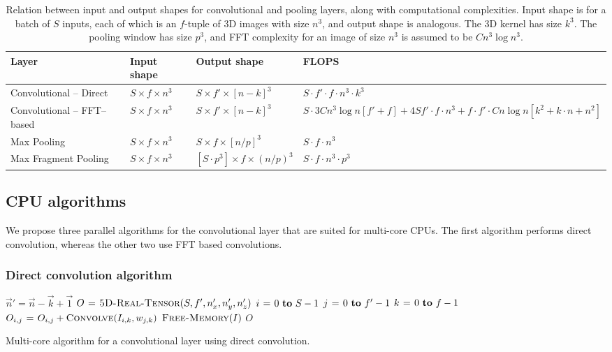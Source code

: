 \documentclass[conference]{./IEEEtran/IEEEtran}
\begin{document}
  \begin{table}[t]
    {\footnotesize
    \centering
    \begin{tabular}{l|lll}
      \toprule
      Layer   & Input shape    & Output shape     & FLOPS \\
      \midrule
      Convolutional -- Direct &
      $S \times f \times n^3$ &
      $S \times f' \times [n-k]^3$ &
      $S \cdot f' \cdot f \cdot n^3 \cdot k^3$ \\
      Convolutional -- FFT--based &
      $S \times f \times n^3$ &
      $S \times f' \times [n-k]^3$ &
      $S \cdot 3Cn^3 \log n[f' + f] + 4Sf' \cdot f \cdot n^3 + f \cdot f' \cdot Cn \log n[k^2 + k \cdot n + n^2]$ \\
      Max Pooling &
      $S \times f \times n^3$ &
      $S \times f \times [n/p]^3$ &
      $S \cdot f \cdot n^3$ \\
      Max Fragment Pooling &
      $S \times f \times n^3$ &
      $[S \cdot p^3] \times f \times (n/p)^3$ &
      $S \cdot f \cdot n^3 \cdot p^3$ \\
      \bottomrule
    \end{tabular}
    \caption{Relation between input and output shapes for convolutional and pooling layers, along with computational complexities. Input shape is for a batch of $S$ inputs, each of which is an $f$-tuple of 3D images with size $n^3$, and output shape is analogous. The 3D kernel has size $k^3$. The pooling window has size $p^3$, and FFT complexity for an image of size $n^3$ is assumed to be $C n^3\log n^3$.}
    \label{table:layers_complexity}
    }
  \end{table}


\subsection{CPU algorithms}

  We propose three parallel algorithms for the convolutional layer
  that are suited for multi-core CPUs.  The first algorithm performs
  direct convolution, whereas the other two use FFT based
  convolutions.

\subsubsection{Direct convolution algorithm}

  \begin{algorithm}
    {\footnotesize
      \begin{codebox}
        \li $\vec{n}' = \vec{n} - \vec{k} + \vec{1}$
        \li $O \mathrel{\hspace{1pt}=\hspace{1pt}} \textnormal{\scshape5D-Real-Tensor}(S,f',n'_x,n'_y,n'_z)$
        \li {} $i \gets 0 \To S-1$
        \li   \Do {} $j \gets 0 \To f'-1$
        \li     \Do \For $k \gets 0 \To f-1$
        \li     \Do $O_{i,j} \mathrel{\hspace{1pt}=\hspace{1pt}} O_{i,j} + \textnormal{\scshape Convolve}(I_{i,k},w_{j,k})$
        \End \End \End
        \li $\textnormal{\scshape Free-Memory}(I)$
        \li \Return $O$
      \end{codebox}
    \caption{Multi-core algorithm for a convolutional layer using direct
      convolution.}
    \label{alg:cpu_direct}
    }
  \end{algorithm}
\end{document}
